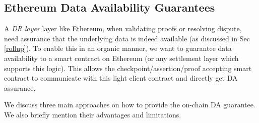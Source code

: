 \documentclass[sigconf, screen=true, nonacm]{acmart}
\newcommand{\DR}{\textit{DR layer}}
\begin{document}
    \subsection{Ethereum Data Availability Guarantees}
        A \DR{} layer like Ethereum, when validating proofs or resolving dispute, need assurance that the underlying data is indeed available (as discussed in Sec \ref{rollup}). To enable this in an organic manner, we want to guarantee data availability to a smart contract on Ethereum (or any settlement layer which supports this logic). This allows the checkpoint/assertion/proof accepting smart contract to communicate with this light client contract and directly get DA assurance. 

        We discuss three main approaches on how to provide the on-chain DA guarantee. We also briefly mention their advantages and limitations. 

        
\end{document}
